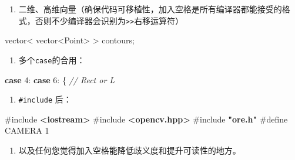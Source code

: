 \documentclass[
]{article}
\newenvironment{Shaded}{}{}
\newcommand{\CommentTok}[1]{\textcolor[rgb]{0.38,0.63,0.69}{\textit{#1}}}
\newcommand{\ControlFlowTok}[1]{\textcolor[rgb]{0.00,0.44,0.13}{\textbf{#1}}}
\newcommand{\DecValTok}[1]{\textcolor[rgb]{0.25,0.63,0.44}{#1}}
\newcommand{\ImportTok}[1]{\textcolor[rgb]{0.00,0.50,0.00}{\textbf{#1}}}
\newcommand{\NormalTok}[1]{#1}
\newcommand{\OperatorTok}[1]{\textcolor[rgb]{0.40,0.40,0.40}{#1}}
\newcommand{\PreprocessorTok}[1]{\textcolor[rgb]{0.74,0.48,0.00}{#1}}
\begin{document}
\begin{enumerate}
\def\labelenumi{\arabic{enumi}.}
\item
  二维、高维向量（确保代码可移植性，加入空格是所有编译器都能接受的格式，否则不少编译器会识别为\texttt{\textgreater{}\textgreater{}}右移运算符）
\end{enumerate}

\begin{Shaded}
\begin{Highlighting}[]
\NormalTok{vector}\OperatorTok{\textless{}}\NormalTok{ vector}\OperatorTok{\textless{}}\NormalTok{Point}\OperatorTok{\textgreater{}} \OperatorTok{\textgreater{}}\NormalTok{ contours}\OperatorTok{;}
\end{Highlighting}
\end{Shaded}

\begin{enumerate}
\def\labelenumi{\arabic{enumi}.}
\item
  多个\texttt{case}的合用：
\end{enumerate}

\begin{Shaded}
\begin{Highlighting}[]
\ControlFlowTok{case} \DecValTok{4}\OperatorTok{:} \ControlFlowTok{case} \DecValTok{6}\OperatorTok{:} \OperatorTok{\{} \CommentTok{// Rect or \textquotesingle{}L\textquotesingle{}}
\end{Highlighting}
\end{Shaded}

\begin{enumerate}
\def\labelenumi{\arabic{enumi}.}
\item
  \texttt{\#include} 后：
\end{enumerate}

\begin{Shaded}
\begin{Highlighting}[]
\PreprocessorTok{\#include }\ImportTok{\textless{}iostream\textgreater{}}
\PreprocessorTok{\#include }\ImportTok{\textless{}opencv.hpp\textgreater{}}
\PreprocessorTok{\#include }\ImportTok{"ore.h"}
\PreprocessorTok{\#define CAMERA }\DecValTok{1}
\end{Highlighting}
\end{Shaded}

\begin{enumerate}
\def\labelenumi{\arabic{enumi}.}
\item
  以及任何您觉得加入空格能降低歧义度和提升可读性的地方。
\end{enumerate}
\end{document}
